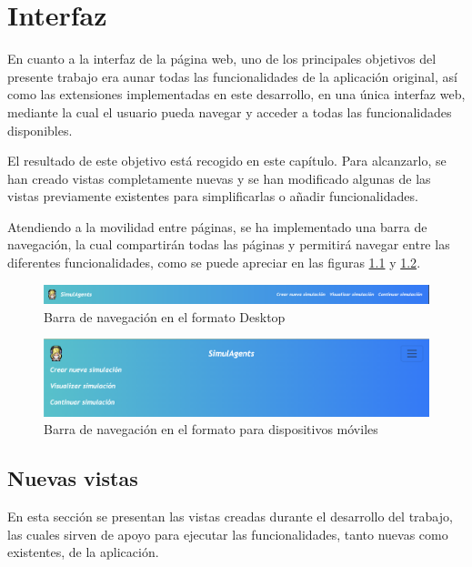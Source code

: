 \chapter{Interfaz}
\label{cap:interfaz}

En cuanto a la interfaz de la página web, uno de los principales objetivos del presente trabajo era aunar todas las funcionalidades de la aplicación original, así como las extensiones implementadas en este desarrollo, en una única interfaz web, mediante la cual el usuario pueda navegar y acceder a todas las funcionalidades disponibles.

El resultado de este objetivo está recogido en este capítulo. Para alcanzarlo, se han creado vistas completamente nuevas y se han modificado algunas de las vistas previamente existentes para simplificarlas o añadir funcionalidades.

Atendiendo a la movilidad entre páginas, se ha implementado una barra de navegación, la cual compartirán todas las páginas y permitirá navegar entre las diferentes funcionalidades, como se puede apreciar en las figuras \ref{fig:navBarDesktop} y \ref{fig:navBarMobile}.

\begin{figure}[h]
	\centering
	\includegraphics[width = 1\textwidth]{Imagenes/Vectorial/navBarDesktop.png}
	\caption{Barra de navegación en el formato Desktop}
	\label{fig:navBarDesktop}
\end{figure}

\begin{figure}[h]
	\centering
	\includegraphics[width = 1\textwidth]{Imagenes/Vectorial/navBarMobile.png}
	\caption{Barra de navegación en el formato para dispositivos móviles}
	\label{fig:navBarMobile}
\end{figure}

\section{Nuevas vistas}

En esta sección se presentan las vistas creadas durante el desarrollo del trabajo, las cuales sirven de apoyo para ejecutar las funcionalidades, tanto nuevas como existentes, de la aplicación.

